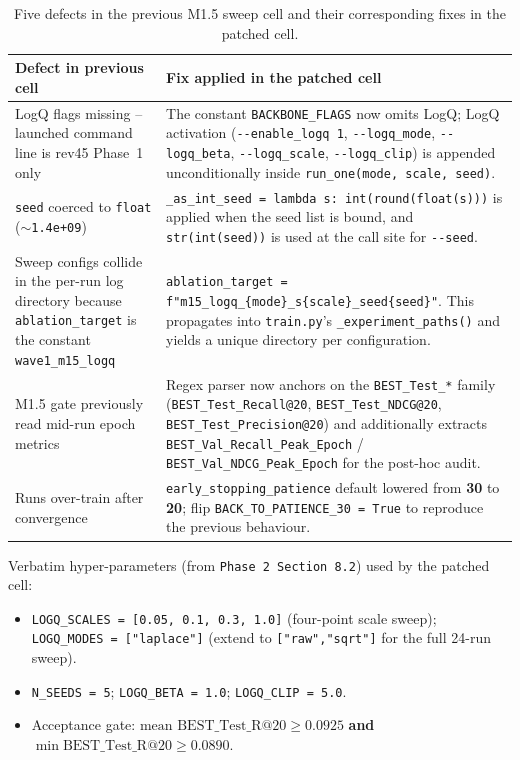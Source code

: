 \documentclass[11pt, a4paper]{article}
\begin{document}
\begin{table}[h]
\centering
\renewcommand{\arraystretch}{1.25}
\begin{tabularx}{\textwidth}{@{}p{}Z@{}}
\toprule
{}
\textbf{Defect in previous cell} & \textbf{Fix applied in the patched cell} \\
\midrule
LogQ flags missing -- launched command line is rev45 Phase~1 only &
The constant \texttt{BACKBONE\_FLAGS} now omits LogQ; LogQ activation
(\texttt{-{}-enable\_logq 1}, \texttt{-{}-logq\_mode}, \texttt{-{}-logq\_beta},
\texttt{-{}-logq\_scale}, \texttt{-{}-logq\_clip}) is appended unconditionally
inside \texttt{run\_one(mode, scale, seed)}. \\
\texttt{seed} coerced to \texttt{float} ($\sim$\texttt{1.4e+09}) &
\texttt{\_as\_int\_seed = lambda s: int(round(float(s)))} is applied when the
seed list is bound, and \texttt{str(int(seed))} is used at the call site for
\texttt{-{}-seed}. \\
Sweep configs collide in the per-run log directory because
\texttt{ablation\_target} is the constant \texttt{wave1\_m15\_logq} &
\texttt{ablation\_target = f"m15\_logq\_\{mode\}\_s\{scale\}\_seed\{seed\}"}.
This propagates into \texttt{train.py}'s \texttt{\_experiment\_paths()} and
yields a unique directory per configuration. \\
M1.5 gate previously read mid-run epoch metrics & Regex parser now anchors on
the \texttt{BEST\_Test\_*} family
(\texttt{BEST\_Test\_Recall@20}, \texttt{BEST\_Test\_NDCG@20},
\texttt{BEST\_Test\_Precision@20}) and additionally extracts
\texttt{BEST\_Val\_Recall\_Peak\_Epoch} /
\texttt{BEST\_Val\_NDCG\_Peak\_Epoch} for the post-hoc audit. \\
Runs over-train after convergence & \texttt{early\_stopping\_patience} default
lowered from \textbf{30} to \textbf{20}; flip \texttt{BACK\_TO\_PATIENCE\_30
= True} to reproduce the previous behaviour. \\
\bottomrule
\end{tabularx}
\caption{Five defects in the previous M1.5 sweep cell and their corresponding
fixes in the patched cell.}
\end{table}

Verbatim hyper-parameters (from \texttt{Phase 2 Section 8.2}) used by the
patched cell:

\begin{itemize}[leftmargin=*,itemsep=2pt]
  \item \texttt{LOGQ\_SCALES = [0.05, 0.1, 0.3, 1.0]} (four-point scale sweep);
        \texttt{LOGQ\_MODES = ["laplace"]} (extend to \texttt{["raw","sqrt"]}
        for the full 24-run sweep).
  \item \texttt{N\_SEEDS = 5}; \texttt{LOGQ\_BETA = 1.0}; \texttt{LOGQ\_CLIP = 5.0}.
  \item Acceptance gate: $\text{mean BEST\_Test\_R@20} \ge 0.0925$ \textbf{and}
        $\min \text{BEST\_Test\_R@20} \ge 0.0890$.
\end{itemize}
\end{document}
